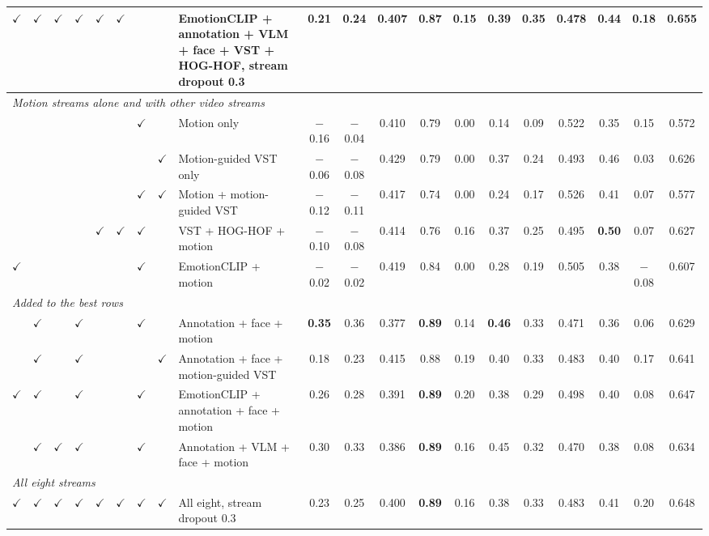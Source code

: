 \documentclass[11pt]{article}
\newcommand{\best}[1]{\textbf{#1}}
\begin{document}
\begin{table}[!htbp]
{\begin{tabular}{cccccccclccccccccccc}
$\checkmark$ & $\checkmark$ & $\checkmark$ & $\checkmark$ & $\checkmark$ & $\checkmark$ &  &  & EmotionCLIP + annotation + VLM + face + VST + HOG-HOF, stream dropout 0.3 & 0.21 & 0.24 & 0.407 & 0.87 & 0.15 & 0.39 & \best{0.35} & 0.478 & 0.44 & 0.18 & 0.655 \\
\midrule
\multicolumn{20}{l}{\emph{Motion streams alone and with other video streams}} \\
 &  &  &  &  &  & $\checkmark$ &  & Motion only & $-$0.16 & $-$0.04 & 0.410 & 0.79 & 0.00 & 0.14 & 0.09 & 0.522 & 0.35 & 0.15 & 0.572 \\
 &  &  &  &  &  &  & $\checkmark$ & Motion-guided VST only & $-$0.06 & $-$0.08 & 0.429 & 0.79 & 0.00 & 0.37 & 0.24 & 0.493 & 0.46 & 0.03 & 0.626 \\
 &  &  &  &  &  & $\checkmark$ & $\checkmark$ & Motion + motion-guided VST & $-$0.12 & $-$0.11 & 0.417 & 0.74 & 0.00 & 0.24 & 0.17 & 0.526 & 0.41 & 0.07 & 0.577 \\
 &  &  &  & $\checkmark$ & $\checkmark$ & $\checkmark$ &  & VST + HOG-HOF + motion & $-$0.10 & $-$0.08 & 0.414 & 0.76 & 0.16 & 0.37 & 0.25 & 0.495 & \best{0.50} & 0.07 & 0.627 \\
$\checkmark$ &  &  &  &  &  & $\checkmark$ &  & EmotionCLIP + motion & $-$0.02 & $-$0.02 & 0.419 & 0.84 & 0.00 & 0.28 & 0.19 & 0.505 & 0.38 & $-$0.08 & 0.607 \\
\midrule
\multicolumn{20}{l}{\emph{Added to the best rows}} \\
 & $\checkmark$ &  & $\checkmark$ &  &  & $\checkmark$ &  & Annotation + face + motion & \best{0.35} & 0.36 & 0.377 & \best{0.89} & 0.14 & \best{0.46} & 0.33 & 0.471 & 0.36 & 0.06 & 0.629 \\
 & $\checkmark$ &  & $\checkmark$ &  &  &  & $\checkmark$ & Annotation + face + motion-guided VST & 0.18 & 0.23 & 0.415 & 0.88 & 0.19 & 0.40 & 0.33 & 0.483 & 0.40 & 0.17 & 0.641 \\
$\checkmark$ & $\checkmark$ &  & $\checkmark$ &  &  & $\checkmark$ &  & EmotionCLIP + annotation + face + motion & 0.26 & 0.28 & 0.391 & \best{0.89} & 0.20 & 0.38 & 0.29 & 0.498 & 0.40 & 0.08 & 0.647 \\
 & $\checkmark$ & $\checkmark$ & $\checkmark$ &  &  & $\checkmark$ &  & Annotation + VLM + face + motion & 0.30 & 0.33 & 0.386 & \best{0.89} & 0.16 & 0.45 & 0.32 & 0.470 & 0.38 & 0.08 & 0.634 \\
\midrule
\multicolumn{20}{l}{\emph{All eight streams}} \\
$\checkmark$ & $\checkmark$ & $\checkmark$ & $\checkmark$ & $\checkmark$ & $\checkmark$ & $\checkmark$ & $\checkmark$ & All eight, stream dropout 0.3 & 0.23 & 0.25 & 0.400 & \best{0.89} & 0.16 & 0.38 & 0.33 & 0.483 & 0.41 & 0.20 & 0.648 \\

\end{tabular}}
\end{table}
\end{document}
